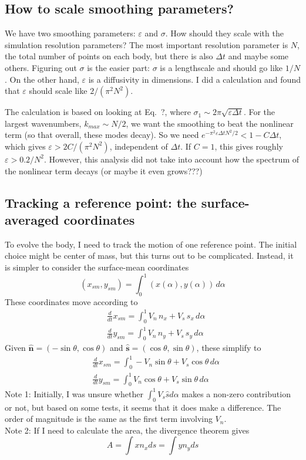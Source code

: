 \documentclass[11pt]{article}
\newcommand{\td}[2] { \frac{d #1} { d #2 } }
\newcommand{\bvec}[1]{\ensuremath{\boldsymbol{#1}}}
\newcommand{\nhat}{\hat{\bvec{n}}}
\newcommand{\shat}{\hat{\bvec{s}}}
\newcommand{\eps}{\varepsilon}
\begin{document}
\subsection{How to scale smoothing parameters?}
We have two smoothing parameters: $\eps$ and $\sigma$. How should they scale with the simulation resolution parameters? The most important resolution parameter is $N$, the total number of points on each body, but there is also $\Delta t$ and maybe some others. Figuring out $\sigma$ is the easier part: $\sigma$ is a lengthscale and should go like $1/N$. On the other hand, $\eps$ is a diffusivity in dimensions. I did a calculation and found that $\eps$ should scale like $2/(\pi^2 N^2)$.

The calculation is based on looking at Eq.~?, where $\sigma_1 \sim 2 \pi \sqrt{\eps \Delta t}$. For the largest wavenumbers, $k_{max} \sim N/2$, we want the smoothing to beat the nonlinear term (so that overall, these modes decay). So we need $e^{-\pi^2 \eps \Delta t N^2 / 2} < 1 - C\Delta t$, which gives $\eps > 2C/(\pi^2 N^2)$, independent of $\Delta t$. If $C=1$, this gives roughly $\eps > 0.2/ N^2$. However, this analysis did not take into account how the spectrum of the nonlinear term decays (or maybe it even grows???)


\subsection{Tracking a reference point: the surface-averaged coordinates}
To evolve the body, I need to track the motion of one reference point. The initial choice might be center of mass, but this turns out to be complicated. Instead, it is simpler to consider the surface-mean coordinates
\begin{equation}
(x_{sm}, y_{sm}) = \int_0^1 (x(\alpha), y(\alpha)) \, d\alpha
\end{equation}
These coordinates move according to
\begin{align}
& \td{}{t} x_{sm} = \int_0^1 V_n \, n_x + V_s \, s_x \, d\alpha \\
& \td{}{t} y_{sm} = \int_0^1 V_n \, n_y + V_s \, s_y \, d\alpha
\end{align}
Given $\nhat = (-\sin \theta, \cos \theta)$ and $\shat = (\cos \theta, \sin \theta)$, these simplify to
\begin{align}
& \td{}{t} x_{sm} = \int_0^1 -V_n \sin \theta + V_s \cos \theta \, d\alpha \\
& \td{}{t} y_{sm} = \int_0^1 V_n \cos \theta + V_s \sin \theta \, d\alpha
\end{align}
Note 1: Initially, I was unsure whether $\int_0^1 V_s \hat{s} d\alpha$ makes a non-zero contribution or not, but based on some tests, it seems that it does make a difference. The order of magnitude is the same as the first term involving $V_n$. \\
Note 2: If I need to calculate the area, the divergence theorem gives
\begin{equation}
A = \int x n_x ds = \int y n_y ds
\end{equation}
\end{document}

